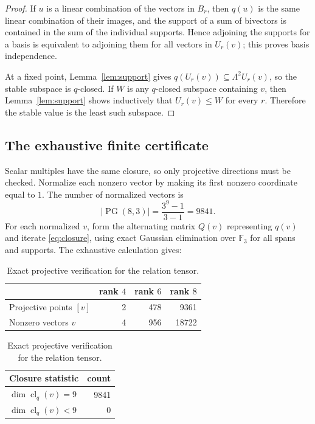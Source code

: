 \documentclass[10pt,a4paper]{amsart}
\newcommand{\F}{\mathbb F}
\newcommand{\PG}{\operatorname{PG}}
\newcommand{\clq}{\operatorname{cl}_q}
\begin{document}
\begin{proof}
If $u$ is a linear combination of the vectors in $B_r$, then $q(u)$ is
the same linear combination of their images, and the support of a sum of
bivectors is contained in the sum of the individual supports.  Hence
adjoining the supports for a basis is equivalent to adjoining them for
all vectors in $U_r(v)$; this proves basis independence.

At a fixed point, Lemma~\ref{lem:support} gives
$q(U_r(v))\subseteq\Lambda^2U_r(v)$, so the stable subspace is $q$-closed.
If $W$ is any $q$-closed subspace containing $v$, then
Lemma~\ref{lem:support} shows inductively that $U_r(v)\leq W$ for every
$r$.  Therefore the stable value is the least such subspace.
\end{proof}

\subsection{The exhaustive finite certificate}\label{subsec:certificate}

Scalar multiples have the same closure, so only projective directions
must be checked.  Normalize each nonzero vector by making its first
nonzero coordinate equal to $1$.  The number of normalized vectors is
\begin{equation}\label{eq:pgcount}
                       |\PG(8,3)|=\frac{3^9-1}{3-1}=9841.
\end{equation}
For each normalized $v$, form the alternating matrix $Q(v)$ representing
$q(v)$ and iterate \eqref{eq:closure}, using exact Gaussian elimination
over $\F_3$ for all spans and supports.  The exhaustive calculation gives:

\begin{table}[ht]
\centering
\caption{Exact projective verification for the relation tensor.}
\label{tab:verification}
\begin{tabular}{@{}lrrr@{}}
\toprule
 & rank $4$ & rank $6$ & rank $8$ \\
\midrule
Projective points $[v]$ & 2 & 478 & 9361 \\
Nonzero vectors $v$     & 4 & 956 & 18722 \\
\bottomrule
\end{tabular}

\medskip
\begin{tabular}{@{}lr@{}}
\toprule
Closure statistic & count \\
\midrule
$\dim\clq(v)=9$ & 9841 \\
$\dim\clq(v)<9$ & 0 \\
\bottomrule
\end{tabular}
\end{table}
\end{document}
